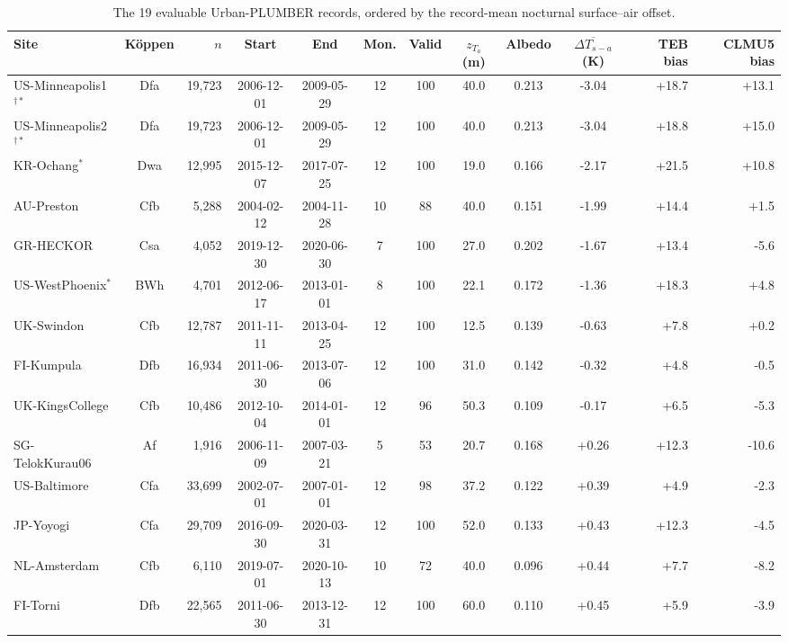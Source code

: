 \begin{table}[!tbp]
\centering\footnotesize
\caption{The 19 evaluable Urban-PLUMBER records, ordered by the record-mean nocturnal surface--air offset.}
\label{tab:sites}
\setlength{\tabcolsep}{3pt}
\begingroup\scriptsize
\begin{tabular}{lcrcccccccrr}
\toprule
Site & K\"{o}ppen & $n$ & Start & End & Mon. & Valid & $z_{T_a}$ (m) & Albedo & $\overline{\Delta T_{s-a}}$ (K) & TEB bias & CLMU5 bias \\
\midrule
US-Minneapolis1$^{\dagger\ast}$ & Dfa & 19,723 & 2006-12-01 & 2009-05-29 & 12 & 100 & 40.0 & 0.213 & -3.04 & +18.7 & +13.1 \\
US-Minneapolis2$^{\dagger\ast}$ & Dfa & 19,723 & 2006-12-01 & 2009-05-29 & 12 & 100 & 40.0 & 0.213 & -3.04 & +18.8 & +15.0 \\
KR-Ochang$^{\ast}$ & Dwa & 12,995 & 2015-12-07 & 2017-07-25 & 12 & 100 & 19.0 & 0.166 & -2.17 & +21.5 & +10.8 \\
AU-Preston & Cfb & 5,288 & 2004-02-12 & 2004-11-28 & 10 & 88 & 40.0 & 0.151 & -1.99 & +14.4 & +1.5 \\
GR-HECKOR & Csa & 4,052 & 2019-12-30 & 2020-06-30 & 7 & 100 & 27.0 & 0.202 & -1.67 & +13.4 & -5.6 \\
US-WestPhoenix$^{\ast}$ & BWh & 4,701 & 2012-06-17 & 2013-01-01 & 8 & 100 & 22.1 & 0.172 & -1.36 & +18.3 & +4.8 \\
UK-Swindon & Cfb & 12,787 & 2011-11-11 & 2013-04-25 & 12 & 100 & 12.5 & 0.139 & -0.63 & +7.8 & +0.2 \\
FI-Kumpula & Dfb & 16,934 & 2011-06-30 & 2013-07-06 & 12 & 100 & 31.0 & 0.142 & -0.32 & +4.8 & -0.5 \\
UK-KingsCollege & Cfb & 10,486 & 2012-10-04 & 2014-01-01 & 12 & 96 & 50.3 & 0.109 & -0.17 & +6.5 & -5.3 \\
SG-TelokKurau06 & Af & 1,916 & 2006-11-09 & 2007-03-21 & 5 & 53 & 20.7 & 0.168 & +0.26 & +12.3 & -10.6 \\
US-Baltimore & Cfa & 33,699 & 2002-07-01 & 2007-01-01 & 12 & 98 & 37.2 & 0.122 & +0.39 & +4.9 & -2.3 \\
JP-Yoyogi & Cfa & 29,709 & 2016-09-30 & 2020-03-31 & 12 & 100 & 52.0 & 0.133 & +0.43 & +12.3 & -4.5 \\
NL-Amsterdam & Cfb & 6,110 & 2019-07-01 & 2020-10-13 & 10 & 72 & 40.0 & 0.096 & +0.44 & +7.7 & -8.2 \\
FI-Torni & Dfb & 22,565 & 2011-06-30 & 2013-12-31 & 12 & 100 & 60.0 & 0.110 & +0.45 & +5.9 & -3.9 \\

\end{tabular}
\end{table}
